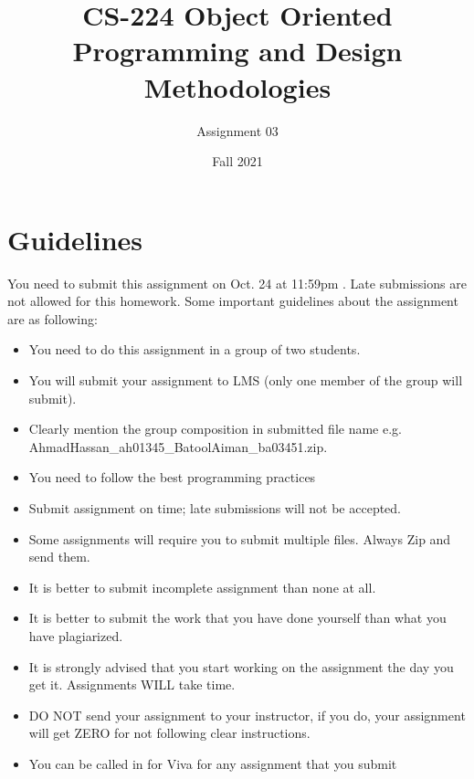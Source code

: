 \documentclass[a4paper,12pt]{article}
\begin{document}
\title{CS-224 Object Oriented Programming and Design Methodologies }
\author{Assignment 03}
\date{Fall 2021}
\maketitle
\section{Guidelines}
You need to submit this assignment on  {\color{red}Oct. 24 at 11:59pm }. Late submissions are not allowed for this homework.
Some important guidelines about the assignment are as following:

\begin{itemize}
	\item You need to do this assignment in a group of two students.
	\item You will submit your assignment to LMS (only one member of the group will submit).
	\item Clearly mention the group composition in submitted file name e.g. AhmadHassan\_ah01345\_BatoolAiman\_ba03451.zip.
	\item You need to follow the best programming practices
	\item Submit assignment on time; late submissions will not be accepted.
	\item Some assignments will require you to submit multiple files. Always Zip and send them.
	\item It is better to submit incomplete assignment than none at all.
	\item It is better to submit the work that you have done yourself than what you have plagiarized.
	\item It is strongly advised that you start working on the assignment the day you get it. Assignments WILL take time.
	\item DO NOT send your assignment to your instructor, if you do, your assignment will get ZERO for not following clear instructions.
	\item You can be called in for Viva for any assignment that you submit
\end{itemize}
\end{document}
